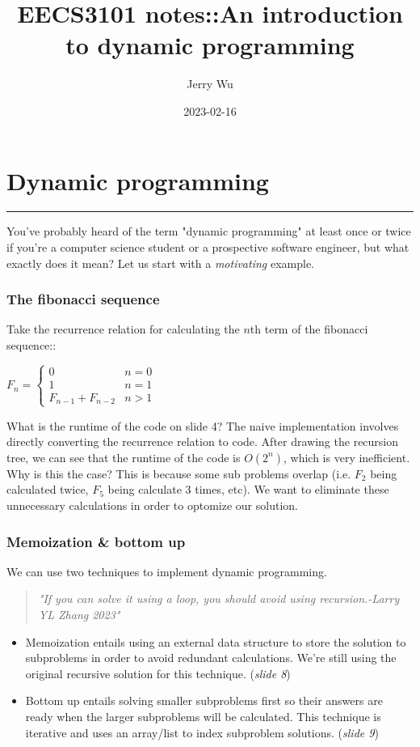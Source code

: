 \documentclass[12pt]{book}
\title{EECS3101 notes::An introduction to dynamic programming}
\author{Jerry Wu}
\date{2023-02-16}
\begin{document}
\maketitle
\chapter*{Dynamic programming}

\rule{\textwidth}{0.4pt}
You've probably heard of the term "dynamic programming" at least once or twice if you're a computer science student or a prospective software engineer, but what exactly does it mean? Let us start with a \textit{motivating} example.

\subsection*{The fibonacci sequence}

Take the recurrence relation for calculating the $n$th term of the fibonacci sequence::

$F_n=\begin{cases}
    0 & n=0\\
    1 & n=1\\
    F_{n-1}+F_{n-2} & n>1
\end{cases}$

What is the runtime of the code on slide 4? The naive implementation involves directly converting the recurrence relation to code. After drawing the recursion tree, we can see that the runtime of the code is $O(2^n)$, which is very inefficient. Why is this the case? This is because some sub problems overlap (i.e. $F_2$ being calculated twice, $F_5$ being calculate 3 times, etc). We want to eliminate these unnecessary calculations in order to optomize our solution.

\subsection*{Memoization \& bottom up}
We can use two techniques to implement dynamic programming. 

\begin{quote}
    \textit{"If you can solve it using a loop, you should avoid using recursion.-Larry YL Zhang 2023"}
\end{quote}

\begin{itemize}
    \item Memoization entails using an external data structure to store the solution to subproblems in order to avoid redundant calculations. We're still using the original recursive solution for this technique. (\textit{slide 8})
    \item Bottom up entails solving smaller subproblems first so their answers are ready when the larger subproblems will be calculated. This technique is iterative and uses an array/list to index subproblem solutions. (\textit{slide 9})
\end{itemize}
\end{document}
